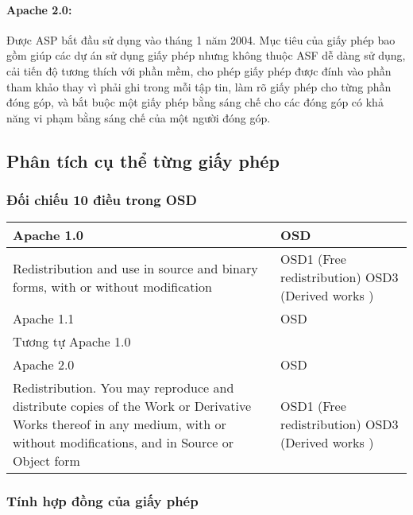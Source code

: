 \documentclass[12pt]{article}
\begin{document}
\paragraph{Apache 2.0:}
Được ASP bắt đầu sử dụng vào tháng 1 năm 2004. Mục tiêu của giấy phép bao gồm giúp các dự án sử dụng giấy phép nhưng không thuộc ASF dễ dàng sử dụng, cải tiến độ tương thích với phần mềm, cho phép giấy phép được đính vào phần tham khảo thay vì phải ghi trong mỗi tập tin, làm rõ giấy phép cho từng phần đóng góp, và bắt buộc một giấy phép bằng sáng chế cho các đóng góp có khả năng vi phạm bằng sáng chế của một người đóng góp.

\subsection{Phân tích cụ thể từng giấy phép}
\subsubsection{Đối chiếu 10 điều trong OSD}

\begin{tabularx}{\textwidth}{|X|X|}
\hline
Apache 1.0 & OSD \\ 
\hline 
Redistribution and use in source and binary forms, with or without modification \newline
& 
OSD1 (Free redistribution) \newline
OSD3 (Derived works ) \\
\hline


Apache 1.1 & OSD \\ 
\hline 
Tương tự Apache 1.0 \newline
& 
\\
\hline

Apache 2.0 & OSD \\ 
\hline 
Redistribution. You may reproduce and distribute copies of the Work or Derivative Works thereof in any medium, with or without modifications, and in Source or Object form
&
OSD1 (Free redistribution) \newline
OSD3 (Derived works )
\\
\hline
\end{tabularx}


\subsubsection{Tính hợp đồng của giấy phép}
\end{document}
